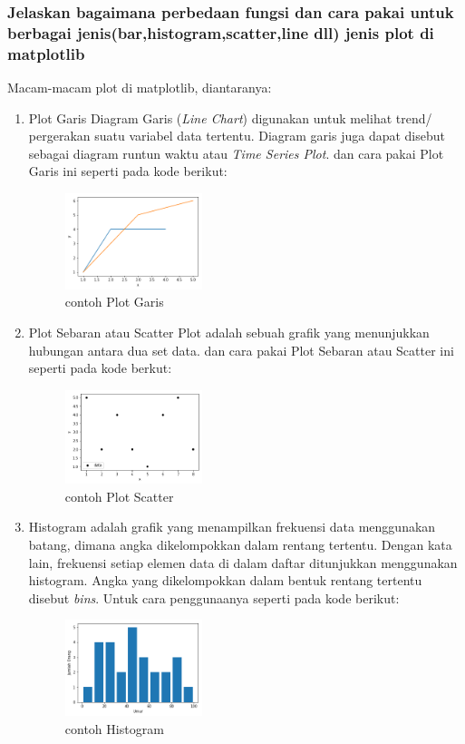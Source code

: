 \subsubsection{Jelaskan bagaimana perbedaan fungsi dan cara pakai untuk berbagai jenis(bar,histogram,scatter,line dll) jenis plot di matplotlib}
\hfill \break
Macam-macam plot di matplotlib, diantaranya:
\begin{enumerate}
\item Plot Garis \hfill \break
Diagram Garis (\textit{Line Chart}) digunakan untuk melihat trend/ pergerakan suatu variabel data tertentu. Diagram garis juga dapat disebut sebagai diagram runtun waktu atau \textit{Time Series Plot}. dan cara pakai Plot Garis ini seperti pada kode berikut:

\begin{figure}[ht]	
    \includegraphics[width=4cm]{figures/6/1174083/Teori/2.png}
    \centering
    \caption{contoh Plot Garis}
    \label{2}
\end{figure}
\newpage
\item Plot Sebaran atau Scatter Plot \hfill \break
adalah sebuah grafik yang menunjukkan hubungan antara dua set data. dan cara pakai Plot Sebaran atau Scatter ini seperti pada kode berkut:

\begin{figure}[ht]	
    \includegraphics[width=4cm]{figures/6/1174083/Teori/3.png}
    \centering
    \caption{contoh Plot Scatter}
    \label{3}
\end{figure}

\item Histogram \hfill \break
adalah grafik yang menampilkan frekuensi data menggunakan batang, dimana angka dikelompokkan dalam rentang tertentu. Dengan kata lain, frekuensi setiap elemen data di dalam daftar ditunjukkan menggunakan histogram. Angka yang dikelompokkan dalam bentuk rentang tertentu disebut \textit{bins}. Untuk cara penggunaanya seperti pada kode berikut:

\begin{figure}[ht]	
    \includegraphics[width=4cm]{figures/6/1174083/Teori/4.png}
    \centering
    \caption{contoh Histogram}
    \label{4}
\end{figure}


\end{enumerate}
